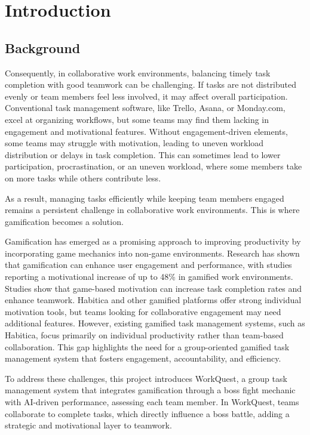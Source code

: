 \chapter{Introduction}
\label{chap:introduction}

\section{Background}
\label{section:background}

Consequently, in collaborative work environments, balancing timely task completion with good teamwork can be challenging.  If tasks are not distributed evenly or team members feel less involved, it may affect overall participation. Conventional task management software, like Trello, Asana, or Monday.com, excel at organizing workflows, but some teams may find them lacking in engagement and motivational features. Without engagement-driven elements, some teams may struggle with motivation, leading to uneven workload distribution or delays in task completion. This can sometimes lead to lower participation, procrastination, or an uneven workload, where some members take on more tasks while others contribute less. 

As a result, managing tasks efficiently while keeping team members engaged remains a persistent challenge in collaborative work environments. This is where gamification becomes a solution.
 
Gamification has emerged as a promising approach to improving productivity by incorporating game mechanics into non-game environments. Research has shown that gamification can enhance user engagement and performance, with studies reporting a motivational increase of up to 48\% in gamified work environments. Studies show that game-based motivation can increase task completion rates and enhance teamwork. Habitica and other gamified platforms offer strong individual motivation tools, but teams looking for collaborative engagement may need additional features. However, existing gamified task management systems, such as Habitica, focus primarily on individual productivity rather than team-based collaboration. This gap highlights the need for a group-oriented gamified task management system that fosters engagement, accountability, and efficiency.

To address these challenges, this project introduces WorkQuest, a group task management system that integrates gamification through a boss fight mechanic with AI-driven performance, assessing each team member. In WorkQuest, teams collaborate to complete tasks, which directly influence a boss battle, adding a strategic and motivational layer to teamwork.

